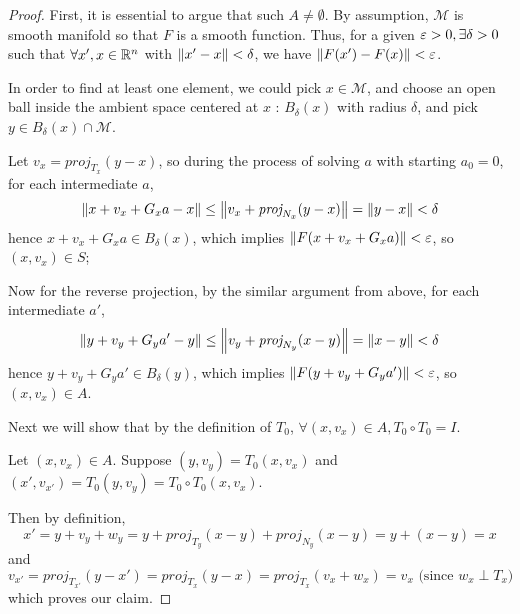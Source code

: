\documentclass{article}
\begin{document}
\begin{proof}
First, it is essential to argue that such $A \neq \emptyset$. By assumption, $\mathscr{M}$ is smooth manifold so that $F$ is a smooth function. Thus, for a given $\varepsilon > 0, \exists \delta > 0$ such that $\forall x',x \in \mathbb R^n$ with $\left\lVert x'- x\right\rVert < \delta$, we have $\left\lVert F(x') - F(x)\right\rVert < \varepsilon$. 

In order to find at least one element, we could pick $x \in \mathscr{M}$, and choose an open ball inside the ambient space centered at $x$ : $B_\delta(x)$ with radius $\delta$, and pick $y \in B_\delta(x) \cap \mathscr{M}$.

Let $v_x = \textit{proj}_{T_x}(y-x)$, so during the process of solving $a$ with starting $a_0 = 0$, for each intermediate $a$, 
\[\left\lVert x + v_x + G_x a - x\right\rVert \leq \left\lVert v_x + \textit{proj}_{N_x}(y-x)\right\rVert = \left\lVert y-x\right\rVert < \delta\]hence $x + v_x + G_x a \in B_\delta(x)$, which implies $\left\lVert F(x + v_x + G_x a)\right\rVert < \varepsilon$, so $(x, v_x) \in S$;

Now for the reverse projection, by the similar argument from above, for each intermediate $a'$, \[\left\lVert y + v_y + G_y a' - y\right\rVert \leq \left\lVert v_y + \textit{proj}_{N_y}(x-y)\right\rVert = \left\lVert x-y\right\rVert < \delta\]hence $y + v_y + G_y a' \in B_\delta(y)$, which implies $\left\lVert F(y + v_y + G_y a')\right\rVert < \varepsilon$, so $(x, v_x) \in A$.


Next we will show that by the definition of $T_0$, $\forall (x, v_x) \in A, T_0 \circ T_0 = I$. 

Let $(x, v_x) \in A$. Suppose $(y, v_y) = T_0(x, v_x)$ and $(x', v_{x'}) = T_0(y, v_y) = T_0\circ T_0(x, v_x)$.

Then by definition, 
\[x' = y + v_y + w_y = y + \textit{proj}_{T_y}(x-y) + \textit{proj}_{N_y}(x-y) = y + (x - y) = x\]and
\[v_{x'} = \textit{proj}_{T_{x'}}(y-x') = \textit{proj}_{T_x}(y-x) = \textit{proj}_{T_x}(v_x + w_x) = v_x \text{ (since $w_x \perp T_x$)}\]
which proves our claim.
\end{proof}
\end{document}
